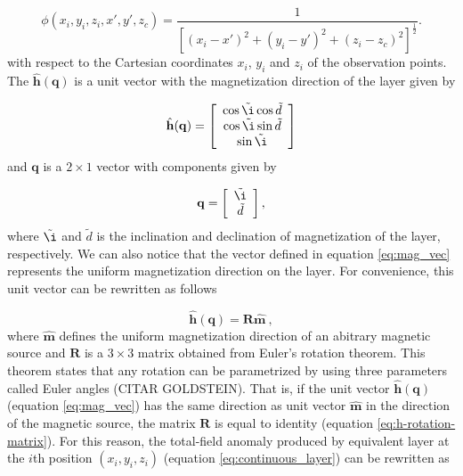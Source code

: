 \begin{equation}
\phi (x_i,y_i,z_i,x',y',z_c) = \frac{1}{[(x_i-x')^2 + (y_i-y')^2 + (z_i-z_c)^2]^{\frac{1}{2}}} .
\label{eq:phi}
\end{equation}
with respect to the Cartesian coordinates $x_i$, $y_i$ and $z_i$ of the observation points. The $\hat{\mathbf{h}}(\mathbf{q})$ is a unit vector with the magnetization direction of the layer given by 

\begin{equation}
	\hat{\mathbf{h}}(\mathbf{q}) =
	\left[ \begin{array}{c}
		\cos \tilde{\i} \cos \tilde{d} \\
		\cos \tilde{\i} \sin \tilde{d}\\
		\sin \tilde{\i}
	\end{array} \right] 
	\label{eq:mag_vec}
\end{equation}
and $\mathbf{q}$ is a $2 \times 1$ vector with components given by 

\begin{equation}
	\mathbf{q} =
	\left[ \begin{array}{c}
		\tilde{\i} \\ 
		\tilde{d} 
	\end{array} \right] ,
	\label{eq:q_vector}
\end{equation}
where $\tilde{\i} $ and $\tilde{d} $ is the inclination and declination of magnetization of the layer, respectively. We can also notice that the vector defined in equation \ref{eq:mag_vec} represents the uniform magnetization direction on the layer. For convenience, this unit vector can be rewritten as follows

\begin{equation}
\hat{\mathbf{h}}(\mathbf{q}) = \mathbf{R}\hat{\mathbf{m}} \: ,
\label{eq:h-rotation-matrix}
\end{equation}
where $\hat{\mathbf{m}}$ defines the uniform magnetization direction of an abitrary magnetic source and $\mathbf{R}$ is a $3 \times 3$ matrix obtained from Euler's rotation theorem. This theorem states that any rotation can be parametrized by using three parameters called Euler angles (CITAR GOLDSTEIN). That is, if the unit vector $\hat{\mathbf{h}}(\mathbf{q})$ (equation \ref{eq:mag_vec}) has the same direction as unit vector  $\hat{\mathbf{m}}$ in the direction of the magnetic source, the matrix $\mathbf{R}$ is equal to identity (equation \ref{eq:h-rotation-matrix}). For this reason, the total-field anomaly produced by equivalent layer at the $i$th position $(x_i,y_i,z_i)$ (equation \ref{eq:continuous_layer}) can be rewritten as 

